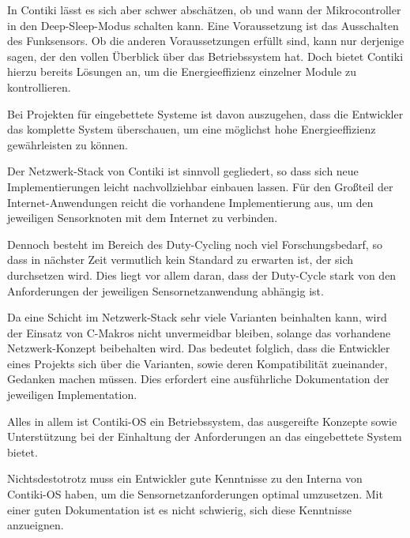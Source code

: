 	In Contiki lässt es sich aber schwer abschätzen, ob und wann der
	Mikrocontroller in den Deep-Sleep-Modus schalten kann.  Eine
	Voraussetzung ist \iA das Ausschalten des Funksensors. Ob die anderen
	Voraussetzungen erfüllt sind, kann nur derjenige sagen, der den vollen
	Überblick über das Betriebssystem hat. Doch bietet Contiki hierzu
	bereits Lösungen an, um die Energieeffizienz einzelner Module zu
	kontrollieren.

	Bei Projekten für eingebettete Systeme ist davon auszugehen, dass
	die Entwickler das komplette System überschauen, um eine möglichst
	hohe Energieeffizienz gewährleisten zu können.

\medskip

	Der Netzwerk-Stack von Contiki ist sinnvoll gegliedert, so dass sich
	neue Implementierungen leicht nachvollziehbar einbauen lassen.
	Für den Großteil der Internet-Anwendungen reicht die vorhandene
	Implementierung aus, um den jeweiligen Sensorknoten mit dem Internet
	zu verbinden.

	Dennoch besteht im Bereich des Duty-Cycling noch viel Forschungsbedarf,
	so dass in nächster Zeit vermutlich kein Standard zu erwarten ist, der
	sich durchsetzen wird. Dies liegt vor allem daran, dass der Duty-Cycle
	stark von den Anforderungen der jeweiligen Sensornetzanwendung abhängig
	ist.

	Da eine Schicht im Netzwerk-Stack sehr viele Varianten beinhalten kann,
	wird der Einsatz von C-Makros nicht unvermeidbar bleiben, solange das
	vorhandene Netzwerk-Konzept beibehalten wird.  Das bedeutet folglich,
	dass die Entwickler eines Projekts sich über die Varianten, sowie deren
	Kompatibilität zueinander, Gedanken machen müssen.  Dies erfordert eine
	ausführliche Dokumentation der jeweiligen Implementation.

\medskip

	Alles in allem ist Contiki-OS ein Betriebssystem, das ausgereifte
	Konzepte sowie Unterstützung bei der Einhaltung der Anforderungen an
	das eingebettete System bietet.

	Nichtsdestotrotz muss ein Entwickler gute Kenntnisse zu den Interna von
	Contiki-OS haben, um die Sensornetzanforderungen optimal umzusetzen.
	Mit einer guten Dokumentation ist es nicht schwierig, sich diese
	Kenntnisse anzueignen.
